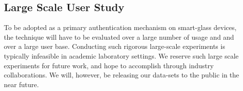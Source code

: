 \subsection{Large Scale User Study}
To be adopted as a primary authentication mechanism on smart-glass devices,
the technique will have to be evaluated over a large number of usage and
and over a large user base. Conducting such rigorous large-scale experiments
is typically infeasible in academic laboratory settings. We reserve such
large scale experiments for future work, and hope to accomplish through
industry collaborations. We will, however, be releasing our data-sets to the 
public in the near future.

